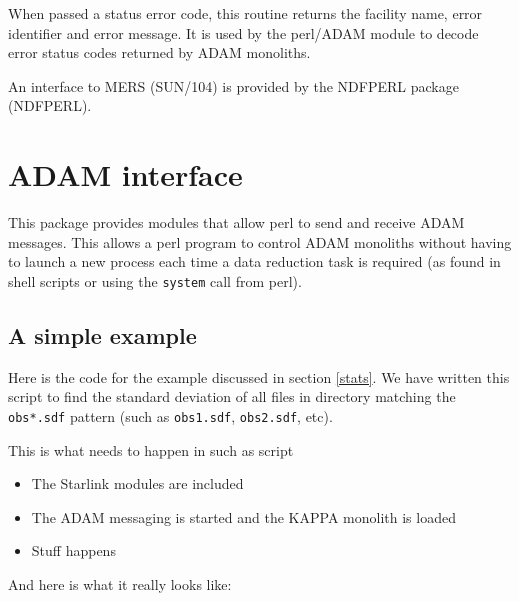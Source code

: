 \documentclass[twoside,11pt]{article}
\newcommand{\xref}[3]{#1}
\renewcommand{\_}{\texttt{\symbol{95}}}
\begin{document}
When passed a status error code, this routine returns the facility
name, error identifier and error message. It is used by the perl/ADAM
module to decode error status codes returned by ADAM monoliths. 

An interface to MERS (\xref{SUN/104}{sun104}{}) is provided by the 
\xref{NDFPERL}{sun222}{} package (\xref{NDFPERL}{SUN/222}{}).

\section{ADAM interface}

This package provides modules that allow perl to send and receive ADAM
messages. This allows a perl program to control ADAM monoliths without having
to launch a new process each time a data reduction task is required (as found
in \xref{shell scripts}{sc4}{} or using the \texttt{system} call from perl).


\subsection{A simple example}

Here is the code for the example discussed in section \ref{stats}. We have
written this script to find the standard deviation of all files in directory
matching the \texttt{obs*.sdf} pattern (such as \texttt{obs1.sdf},
\texttt{obs2.sdf}, etc).

This is what needs to happen in such as script

\begin{itemize} 

\item The Starlink modules are included

\item The ADAM messaging is started and the KAPPA monolith is loaded

\item Stuff happens

\end{itemize}

And here is what it really looks like:
\end{document}
